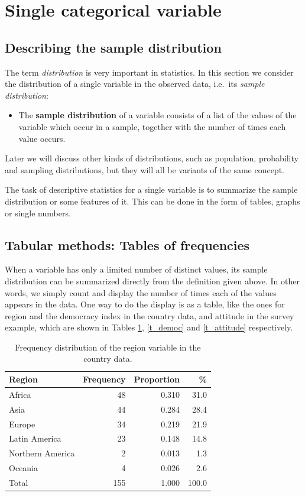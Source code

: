 \section{Single categorical variable}
\label{s_descr1_1cat}

\subsection{Describing the sample distribution}
\label{ss_descr1_1cat_distr}

The term \emph{distribution} is very important in statistics. In this
section we consider the distribution of a single variable in the
observed data, i.e.\ its \emph{sample distribution}:
\begin{itemize}
\item
The \textbf{sample distribution} of a variable consists of a list of the
values of the variable which occur in a sample, together with the
number of times each value occurs.
\end{itemize}
Later we will discuss other kinds of distributions, such as
population, probability and sampling
distributions, but they will all be variants of the same concept.

The task of descriptive statistics for a single variable is to summarize
the sample distribution or some features of it. This can be done in the
form of tables, graphs or single numbers.

\subsection{Tabular methods: Tables of frequencies}
\label{ss_descr1_1cat_tables}

When a variable has only a limited number of distinct values, its sample
distribution can be summarized directly from the definition given above.
In other words, we simply count and display the number of times each of
the values appears in the data. One way to do the display is as a table,
like the ones for region and the democracy index in the country data,
and attitude in the survey example, which are shown in Tables
\ref{t_region}, \ref{t_democ} and \ref{t_attitude} respectively.

\begin{table}[p]
\caption{Frequency distribution of the region variable in the country
data.}
\label{t_region}
\begin{center}
\begin{tabular}{|lrrr|}\hline
Region & Frequency & Proportion & \% \\
\hline
Africa & 48 & 0.310 & 31.0 \\
Asia & 44 & 0.284 & 28.4 \\
Europe & 34 & 0.219 & 21.9 \\
Latin America & 23 & 0.148 & 14.8 \\
Northern America & 2 & 0.013 & 1.3 \\
Oceania & 4 & 0.026 & 2.6 \\ \hline
Total & 155 & 1.000 & 100.0 \\
\hline
\end{tabular}
\end{center}
\end{table}

